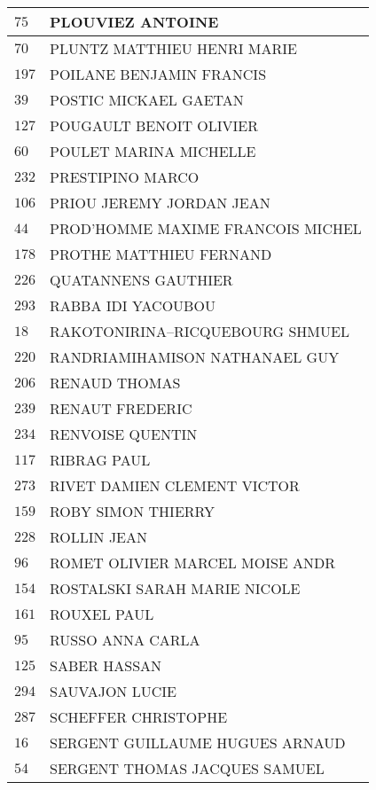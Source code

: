 \begin{xltabular}{\linewidth}{|l|X|}
    \hline
    $75$ & PLOUVIEZ ANTOINE \\
    \hline
    $70$ & PLUNTZ MATTHIEU HENRI MARIE \\
    \hline
    $197$ & POILANE BENJAMIN FRANCIS \\
    \hline
    $39$ & POSTIC MICKAEL GAETAN \\
    \hline
    $127$ & POUGAULT BENOIT OLIVIER \\
    \hline
    $60$ & POULET MARINA MICHELLE \\
    \hline
    $232$ & PRESTIPINO MARCO \\
    \hline
    $106$ & PRIOU JEREMY JORDAN JEAN \\
    \hline
    $44$ & PROD'HOMME MAXIME FRANCOIS MICHEL \\
    \hline
    $178$ & PROTHE MATTHIEU FERNAND \\
    \hline
    $226$ & QUATANNENS GAUTHIER \\
    \hline
    $293$ & RABBA IDI YACOUBOU \\
    \hline
    $18$ & RAKOTONIRINA--RICQUEBOURG SHMUEL \\
    \hline
    $220$ & RANDRIAMIHAMISON NATHANAEL GUY \\
    \hline
    $206$ & RENAUD THOMAS \\
    \hline
    $239$ & RENAUT FREDERIC \\
    \hline
    $234$ & RENVOISE QUENTIN \\
    \hline
    $117$ & RIBRAG PAUL \\
    \hline
    $273$ & RIVET DAMIEN CLEMENT VICTOR \\
    \hline
    $159$ & ROBY SIMON THIERRY \\
    \hline
    $228$ & ROLLIN JEAN \\
    \hline
    $96$ & ROMET OLIVIER MARCEL MOISE ANDR \\
    \hline
    $154$ & ROSTALSKI SARAH MARIE NICOLE \\
    \hline
    $161$ & ROUXEL PAUL \\
    \hline
    $95$ & RUSSO ANNA CARLA \\
    \hline
    $125$ & SABER HASSAN \\
    \hline
    $294$ & SAUVAJON LUCIE \\
    \hline
    $287$ & SCHEFFER CHRISTOPHE \\
    \hline
    $16$ & SERGENT GUILLAUME HUGUES ARNAUD \\
    \hline
    $54$ & SERGENT THOMAS JACQUES SAMUEL \\

\end{xltabular}
